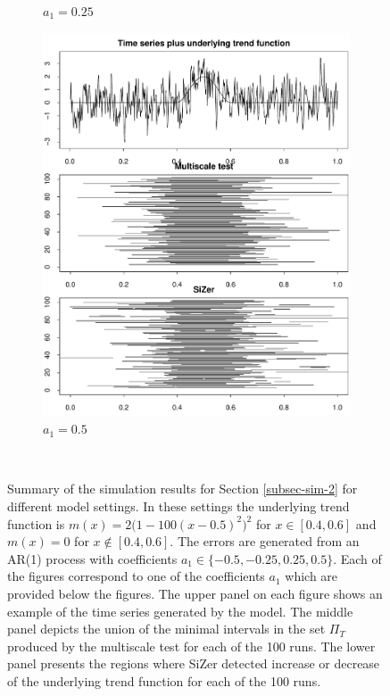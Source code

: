\documentclass[a4paper,12pt]{article}
\begin{document}
\begin{figure}
\begin{subfigure}{.5\textwidth}
  \caption{$a_1 = 0.25$}
  \label{fig:sfig3}
\end{subfigure}%
\begin{subfigure}{.5\textwidth}
  \centering
  \includegraphics[width=.9\linewidth]{Plots/min_int_with_T_500_a1_50.pdf}
  \caption{$a_1 = 0.5$}
  \label{fig:sfig4}
\end{subfigure}\\
\caption{Summary of the simulation results for Section \ref{subsec-sim-2} for different model settings. In these settings the underlying trend function is $m(x) = 2\big(1 - 100(x - 0.5)^2\big)^2$ for $x \in [0.4, 0.6]$ and $m(x) = 0$ for $x \notin [0.4, 0.6]$. The errors are generated from an AR(1) process with coefficients $a_1 \in \{-0.5, -0.25, 0.25, 0.5\}$. Each of the figures correspond to one of the coefficients $a_1$ which are provided below the figures. The upper panel on each figure shows an example of the time series generated by the model. The middle panel depicts the union of the minimal intervals in the set $\Pi_T$ produced by the multiscale test for each of the 100 runs. The lower panel presents the regions where SiZer detected increase or decrease of the underlying trend function for each of the 100 runs.}
\label{fig:comparison_SiZer}
\end{figure}
\end{document}
